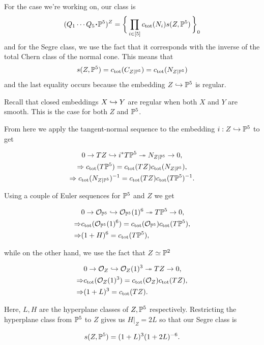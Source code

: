 \documentclass[12pt]{memoir}
\begin{document}
For the case we're working on, our class is
\[
    (Q_1\cdots Q_5\.\bP^5)^Z=\Set{\prod_{i\in[5]}c_{\tot}(N_i)s(Z,\bP^5)}_0
\]
and for the Segre class, we use the fact that it corresponds with the inverse of the total Chern class of the normal cone. This means that
\[
    s(Z,\mathbb{P}^5)=c_{\operatorname{tot}}(C_{Z|\mathbb{P}^5})=c_{\operatorname{tot}}(N_{Z|\mathbb{P}^5})
\]
and the last equality occurs because the embedding \(Z\hookrightarrow\mathbb{P}^5\) is regular.

\begin{Rmk}
    Recall that closed embeddings \(X\hookrightarrow Y\) are regular when both \(X\) and \(Y\) are smooth. This is the case for both \(Z\) and \(\mathbb{P}^5\).
\end{Rmk}

From here we apply the tangent-normal sequence to the embedding \(i:Z\hookrightarrow\mathbb{P}^5\) to get

\begin{gather*}
    0\to TZ\hookrightarrow i^\ast T\mathbb{P}^5\twoheadrightarrow N_{Z|\mathbb{P}^5}\to0,\\
    \Rightarrow c_{\operatorname{tot}}(T\mathbb{P}^5)=c_{\operatorname{tot}}(TZ)c_{\operatorname{tot}}(N_{Z|\mathbb{P}^5}),\\
    \Rightarrow c_{\operatorname{tot}}(N_{Z|\mathbb{P}^5})^{-1}=c_{\operatorname{tot}}(TZ)c_{\operatorname{tot}}(T\mathbb{P}^5)^{-1}.
\end{gather*}

Using a couple of Euler sequences for \(\mathbb{P}^5\) and \(Z\) we get

\begin{align*}
        & 0\to\mathcal{O}_{\mathbb{P}^5}\hookrightarrow\mathcal{O}_{\mathbb{P}^5}(1)^{6}\twoheadrightarrow T\mathbb{P}^5\to 0,          \\
    \Rightarrow & c_{\operatorname{tot}}(\mathcal{O}_{\mathbb{P}^5}(1)^{6})=c_{\operatorname{tot}}(\mathcal{O}_{\mathbb{P}^5})c_{\operatorname{tot}}(T\mathbb{P}^5), \\
    \Rightarrow & (1+H)^6=c_{\operatorname{tot}}(T\mathbb{P}^5),
\end{align*}

while on the other hand, we use the fact that \(Z\simeq \mathbb{P}^2\)


\begin{align*}
        & 0\to\mathcal{O}_{Z}\hookrightarrow\mathcal{O}_{Z}(1)^{3}\twoheadrightarrow TZ\to 0,          \\
    \Rightarrow & c_{\operatorname{tot}}(\mathcal{O}_{Z}(1)^{3})=c_{\operatorname{tot}}(\mathcal{O}_{Z})c_{\operatorname{tot}}(TZ), \\
    \Rightarrow & (1+L)^3=c_{\operatorname{tot}}(TZ).
\end{align*}

Here, \(L,H\) are the hyperplane classes of \(Z,\mathbb{P}^5\) respectively. Restricting the hyperplane class from \(\mathbb{P}^5\) to \(Z\) gives us \(H|_Z=2L\) so that our Segre class is

\[
    s(Z,\mathbb{P}^5)=(1+L)^3(1+2L)^{-6}.
\]
\end{document}
